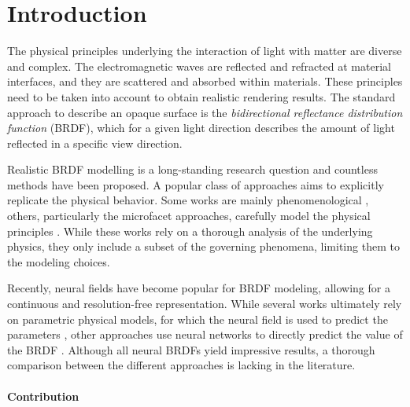 \section{Introduction}
The physical principles underlying the interaction of light with matter are diverse and complex. The electromagnetic waves are reflected and refracted at material interfaces, and they are scattered and absorbed within materials. These principles need to be taken into account to obtain realistic rendering results. The standard approach to describe an opaque surface is the \emph{bidirectional reflectance distribution function} (BRDF), which for a given light direction describes the amount of light reflected in a specific view direction.

Realistic BRDF modelling is a long-standing research question and countless methods have been proposed. A popular class of approaches aims to explicitly replicate the physical behavior. Some works are mainly phenomenological \cite{Blinn77,Phong75}, others, particularly the microfacet approaches, carefully model the physical principles \cite{CookTorranceT82,trowbridge1975average,walter2007microfacet,smith1967geometrical,schlick1994inexpensive}. While these works rely on a thorough analysis of the underlying physics, they only include a subset of the governing phenomena, limiting them to the modeling choices. 




Recently, neural fields have become 
popular for BRDF modeling, allowing for a continuous and resolution-free representation. While several works ultimately rely on parametric physical models, for which the neural field is used to predict the parameters \cite{bi2020neuralReflectanceFields,srinivasan2021nerv,Boss2021NERD,Zhang22IRON,Deschaintre2018SingleImageSVBRDFCaptureDeepNN,Henzler2021GenerativeModellingBRDFFlashIms,Guo2020MaterialGAN,Zhang21PhySG,Zhang2022ModellingIndirIlluminationInvRendering,Brahimi24SuperVol,brahimi24SparseViewsNearLight}, other approaches use neural networks to directly predict the value of the BRDF \cite{sztrajman2021neural,Fan2022NeuralLayeredBRDF,Zhang2021NeRFactor,Sarkar23LitNerf}. Although all neural BRDFs yield impressive results, a thorough comparison between the different approaches is lacking in the literature.

\paragraph{Contribution}

